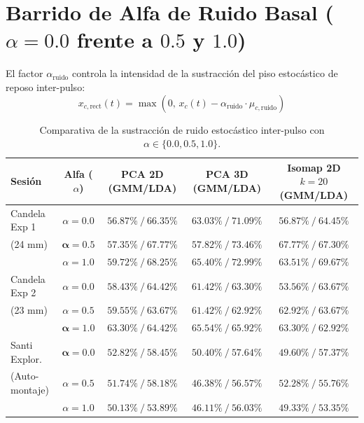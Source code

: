 \documentclass[11pt,a4paper]{article}
\begin{document}
\section{Barrido de Alfa de Ruido Basal ($\alpha = 0.0$ frente a $0.5$ y $1.0$)}

El factor $\alpha_{\text{ruido}}$ controla la intensidad de la sustracción del piso estocástico de reposo inter-pulso:
\begin{equation}
    x_{c,\text{rect}}(t) = \max\left(0,\, x_c(t) - \alpha_{\text{ruido}} \cdot \mu_{c,\text{ruido}}\right)
\end{equation}

\begin{table}[H]
\centering
\footnotesize
\begin{tabularx}{\textwidth}{p{2.3cm} c c c c}
\toprule
\textbf{Sesión} & \textbf{Alfa ($\alpha$)} & \textbf{PCA 2D (GMM/LDA)} & \textbf{PCA 3D (GMM/LDA)} & \textbf{Isomap 2D $k=20$ (GMM/LDA)} \\
\midrule
Candela Exp 1 & $\alpha = 0.0$ & $56.87\% \ / \ 66.35\%$ & $63.03\% \ / \ 71.09\%$ & $56.87\% \ / \ 64.45\%$ \\
(24 mm)      & $\mathbf{\alpha = 0.5}$ & $57.35\% \ / \ 67.77\%$ & $57.82\% \ / \ \mathbf{73.46\%}$ & $\mathbf{67.77\%} \ / \ 67.30\%$ \\
              & $\alpha = 1.0$ & $\mathbf{59.72\%} \ / \ \mathbf{68.25\%}$ & $\mathbf{65.40\%} \ / \ 72.99\%$ & $63.51\% \ / \ \mathbf{69.67\%}$ \\
\midrule
Candela Exp 2 & $\alpha = 0.0$ & $58.43\% \ / \ 64.42\%$ & $61.42\% \ / \ 63.30\%$ & $53.56\% \ / \ 63.67\%$ \\
(23 mm)       & $\alpha = 0.5$ & $59.55\% \ / \ 63.67\%$ & $61.42\% \ / \ 62.92\%$ & $62.92\% \ / \ 63.67\%$ \\
              & $\mathbf{\alpha = 1.0}$ & $\mathbf{63.30\%} \ / \ \mathbf{64.42\%}$ & $\mathbf{65.54\%} \ / \ \mathbf{65.92\%}$ & $\mathbf{63.30\%} \ / \ 62.92\%$ \\
\midrule
Santi Explor. & $\mathbf{\alpha = 0.0}$ & $\mathbf{52.82\%} \ / \ \mathbf{58.45\%}$ & $\mathbf{50.40\%} \ / \ \mathbf{57.64\%}$ & $49.60\% \ / \ \mathbf{57.37\%}$ \\
(Auto-montaje)& $\alpha = 0.5$ & $51.74\% \ / \ 58.18\%$ & $46.38\% \ / \ 56.57\%$ & $\mathbf{52.28\%} \ / \ 55.76\%$ \\
              & $\alpha = 1.0$ & $50.13\% \ / \ 53.89\%$ & $46.11\% \ / \ 56.03\%$ & $49.33\% \ / \ 53.35\%$ \\
\bottomrule
\end{tabularx}
\caption{Comparativa de la sustracción de ruido estocástico inter-pulso con $\alpha \in \{0.0, 0.5, 1.0\}$.}
\label{tab:barrido_alpha}
\end{table}
\end{document}
